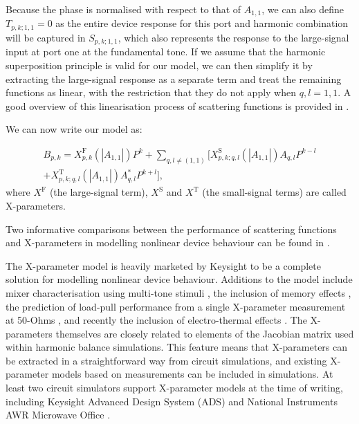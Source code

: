 \documentclass[../thesis/thesis.tex]{subfiles}
\begin{document}
\begin{refsection}
Because the phase is normalised with respect to that of $A_{1, 1}$, we can also define $T_{p,k;1,1}=0$ as the entire device response for this port and harmonic combination will be captured in $S_{p,k;1,1}$, which also represents the response to the large-signal input at port one at the fundamental tone. If we assume that the harmonic superposition principle is valid for our model, we can then simplify it by extracting the large-signal response as a separate term and treat the remaining functions as linear, with the restriction that they do not apply when $q, l = 1, 1$. A good overview of this linearisation process of scattering functions is provided in \cite{Verspecht_2005b}.

We can now write our model as:

\begin{equation}
\begin{split}
B_{p, k}=X^\textrm{F}_{p, k}(|A_{1, 1}|)P^k+\sum_{q, l\ne(1,1)}[X^\textrm{S}_{p, k;q, l}(|A_{1, 1}|)A_{q, l}P^{k-l}\\+X^\textrm{T}_{p, k;q, l}(|A_{1, 1}|)A^*_{q, l}P^{k+l}],
\end{split}
\label{ch5_eqn_xps}
\end{equation}
where $X^\textrm{F}$ (the large-signal term), $X^\textrm{S}$ and $X^\textrm{T}$ (the small-signal terms) are called X-parameters.

Two informative comparisons between the performance of scattering functions and X-parameters in modelling nonlinear device behaviour can be found in \cite{Sun_2010,Widemann_2015}.

The X-parameter model is heavily marketed by Keysight to be a complete solution for modelling nonlinear device behaviour. Additions to the model include mixer characterisation using multi-tone stimuli \cite{Xie_2012}, the inclusion of memory effects \cite{Verspecht_2009}, the prediction of load-pull performance from a single X-parameter measurement at 50-Ohms \cite{Root_2017}, and recently the inclusion of electro-thermal effects \cite{Gillespie_2018}. The X-parameters themselves are closely related to elements of the Jacobian matrix used within harmonic balance simulations. This feature means that X-parameters can be extracted in a straightforward way from circuit simulations, and existing X-parameter models based on measurements can be included in simulations. At least two circuit simulators support X-parameter models at the time of writing, including Keysight Advanced Design System (ADS) \cite{ADS} and National Instruments AWR Microwave Office \cite{AWR}.


\end{refsection}
\end{document}
